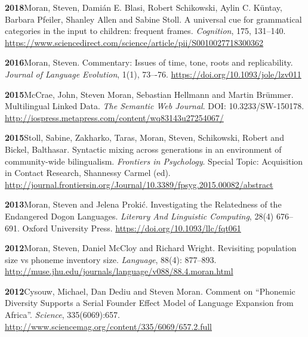 \documentclass[11pt]{article}
\newcommand{\hangpara}{
 \setlength{\parindent}{0in} %
 \hangindent=0.42in %
}
\begin{document}

\hangpara
{\bf 2018}\hspace{1ex}Moran, Steven, Dami{\'a}n E. Blasi, Robert Schikowski, Aylin C. K{\"u}ntay, Barbara Pfeiler, Shanley Allen and Sabine Stoll. A universal cue for grammatical categories in the input to children: frequent frames. \textit{Cognition}, 175, 131--140. \url{https://www.sciencedirect.com/science/article/pii/S0010027718300362}

\hangpara
\vskip 6pt
{\bf 2016}\hspace{1ex}Moran, Steven. Commentary: Issues of time, tone, roots and replicability. \textit{Journal of Language Evolution}, 1(1), 73–-76. \url{https://doi.org/10.1093/jole/lzv011}

\hangpara
\vskip 6pt
{\bf 2015}\hspace{1ex}McCrae, John, Steven Moran, Sebastian Hellmann and Martin Br{\"u}mmer. Multilingual Linked Data. \textit{The Semantic Web Journal}. DOI: 10.3233/SW-150178. \url{http://iospress.metapress.com/content/wq83143u27254067/}

\vskip 6pt
\hangpara
{\bf 2015}\hspace{1ex}Stoll, Sabine, Zakharko, Taras, Moran, Steven, Schikowski, Robert and Bickel, Balthasar. 
Syntactic mixing across generations in an environment of community-wide bilingualism. \textit{Frontiers in Psychology}. Special Topic: Acquisition in Contact Research, Shannessy Carmel (ed). \url{http://journal.frontiersin.org/Journal/10.3389/fpsyg.2015.00082/abstract}

\vskip 6pt
\hangpara
{\bf 2013}\hspace{1ex}Moran, Steven and Jelena Proki{\'c}. Investigating the Relatedness of the Endangered Dogon Languages. \textit{Literary And Linguistic Computing}, 28(4) 676--691. Oxford University Press. \url{https://doi.org/10.1093/llc/fqt061}

\vskip 6pt
\hangpara
{\bf 2012}\hspace{1ex}Moran, Steven, Daniel McCloy and Richard Wright. Revisiting population size vs phoneme inventory size. {\it Language}, 88(4): 877--893. \url{http://muse.jhu.edu/journals/language/v088/88.4.moran.html}

\vskip 6pt
\hangpara
{\bf 2012}\hspace{1ex}Cysouw, Michael, Dan Dediu and Steven Moran. Comment on ``Phonemic Diversity Supports a Serial Founder Effect Model of Language Expansion from Africa''. \textit{Science}, 335(6069):657. \url{http://www.sciencemag.org/content/335/6069/657.2.full}
\end{document}
